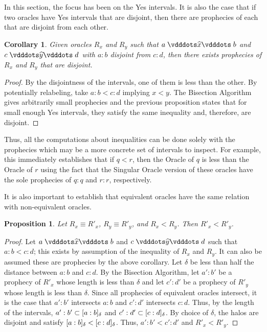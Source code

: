 \documentclass[12pt]{article}
\newtheorem{corollary}{Corollary}[section]
\newtheorem{proposition}{Proposition}[section]
\begin{document}
In this section, the focus has been on the Yes intervals. It is also the case that if two oracles have Yes intervals that are disjoint, then there are prophecies of each that are disjoint from each other.

\begin{corollary}
    Given oracles $R_x$ and $R_y$ such that $a \xora b$ and $c \xora[y] d$ with $a:b$ disjoint from $c:d$, then there exists prophecies of $R_x$ and $R_y$ that are disjoint. 
\end{corollary}

\begin{proof}
    By the disjointness of the intervals, one of them is less than the other. By potentially relabeling, take $a:b < c:d$ implying $x < y$. The Bisection Algorithm gives arbitrarily small prophecies and the previous proposition states that for small enough Yes intervals, they satisfy the same inequality and, therefore, are disjoint. 
\end{proof}

Thus, all the computations about inequalities can be done solely with the prophecies which may be a more concrete set of intervals to inspect. For example, this immediately establishes that if $q < r$, then the Oracle of $q$ is less than the Oracle of $r$ using the fact that the Singular Oracle version of these oracles have the sole prophecies of $q:q$ and $r:r$, respectively. 

It is also important to establish that equivalent oracles have the same relation with non-equivalent oracles. 

\begin{proposition}
    Let $R_x \equiv R'_{x}$, $R_y \equiv R'_{y}$, and $R_x < R_y$. Then $R'_{x} < R'_{y}$.
\end{proposition}

\begin{proof}
    Let $a \xora b$ and $c \xora[y] d$ such that $a:b < c:d$; this exists by assumption of the inequality of $R_x$ and $R_y$. It can also be assumed these are prophecies by the above corollary. Let $\delta$ be less than half the distance between $a:b$ and $c:d$. By the Bisection Algorithm, let $a':b'$ be a prophecy of $R'_x$ whose length is less than $\delta$ and let $c':d'$ be a prophecy of $R'_y$ whose length is less than $\delta$. Since all prophecies of equivalent oracles intersect, it is the case that $a':b'$ intersects $a:b$ and $c':d'$ intersects $c:d$. Thus, by the length of the intervals, $a':b' \subset [a:b]_{\delta}$ and $c':d' \subset [c:d]_{\delta}$. By choice of $\delta$, the halos are disjoint and satisfy $[a:b]_{\delta} < [c:d]_{\delta}$. Thus, $a':b' < c':d'$ and 
    $R'_{x} < R'_{y}$.
\end{proof}
\end{document}
